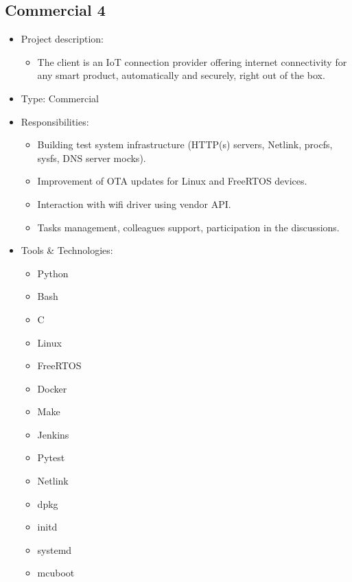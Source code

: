 \hypertarget{proj_com4}{\subsection{Commercial 4}}
\begin{itemize}
    \item Project description:
    \begin{itemize}
        \item The client is an IoT connection provider offering internet connectivity for any smart product,
              automatically and securely, right out of the box.
    \end{itemize}
    \item Type: Commercial
    \item Responsibilities:
    \begin{itemize}
        \item Building test system infrastructure
              (HTTP(s) servers, Netlink, procfs, sysfs, DNS server mocks).
        \item Improvement of OTA updates for Linux and FreeRTOS devices.
        \item Interaction with wifi driver using vendor API.
        \item Tasks management, colleagues support, participation in the discussions.
    \end{itemize}
    \item Tools \& Technologies:
    \begin{itemize}
        \item Python
        \item Bash
        \item C
        \item Linux
        \item FreeRTOS
        \item Docker
        \item Make
        \item Jenkins
        \item Pytest
        \item Netlink
        \item dpkg
        \item initd
        \item systemd
        \item mcuboot
    \end{itemize}
\end{itemize}
\newpage

